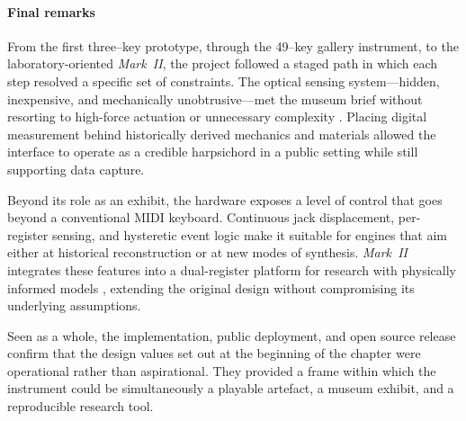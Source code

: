 \paragraph{Final remarks} From the first three–key prototype, through the 49–key gallery instrument, to the laboratory-oriented \emph{Mark~II}, the project followed a staged path in which each step resolved a specific set of constraints. The optical sensing system---hidden, inexpensive, and mechanically unobtrusive---met the museum brief without resorting to high-force actuation or unnecessary complexity \cite{gillespie_haptic_1996,cadoz_modular_1990,timmermans_multibody-based_2020}. Placing digital measurement behind historically derived mechanics and materials \cite{masu_o-in-nime_2023} allowed the interface to operate as a credible harpsichord in a public setting while still supporting data capture.

Beyond its role as an exhibit, the hardware exposes a level of control that goes beyond a conventional MIDI keyboard. Continuous jack displacement, per-register sensing, and hysteretic event logic make it suitable for engines that aim either at historical reconstruction or at new modes of synthesis. \emph{Mark~II} integrates these features into a dual-register platform for research with physically informed models \cite{bologna_nemus_2024}, extending the original design without compromising its underlying assumptions.

Seen as a whole, the implementation, public deployment, and open source release confirm that the design values set out at the beginning of the chapter were operational rather than aspirational. They provided a frame within which the instrument could be simultaneously a playable artefact, a museum exhibit, and a reproducible research tool.

